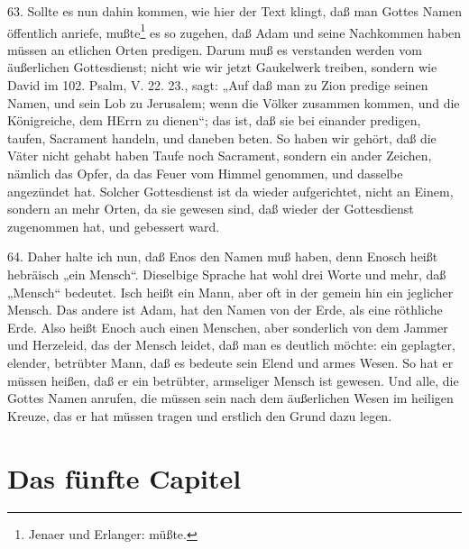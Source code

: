 63. Sollte es nun dahin kommen, wie hier der Text klingt, daß man Gottes Namen öffentlich anriefe, mußte\footnote{Jenaer und Erlanger: müßte.} es so zugehen, daß Adam und seine Nachkommen haben müssen an etlichen Orten predigen. Darum muß es verstanden werden vom äußerlichen Gottesdienst; nicht wie wir jetzt Gaukelwerk treiben, sondern wie David im 102. Psalm, V. 22. 23., sagt: „Auf daß man zu Zion predige seinen Namen, und sein Lob zu Jerusalem; wenn die Völker zusammen kommen, und die Königreiche, dem HErrn zu dienen“; das ist, daß sie bei einander predigen, taufen, Sacrament handeln, und daneben beten. So haben wir gehört, daß die Väter nicht gehabt haben Taufe noch Sacrament, sondern ein ander Zeichen, nämlich das Opfer, da das Feuer vom Himmel genommen, und dasselbe angezündet hat. Solcher Gottesdienst ist da wieder aufgerichtet, nicht an Einem, sondern an mehr Orten, da sie gewesen sind, daß wieder der Gottesdienst zugenommen hat, und gebessert ward.

64. Daher halte ich nun, daß Enos den Namen muß haben, denn Enosch heißt hebräisch „ein Mensch“. Dieselbige Sprache hat wohl drei Worte und mehr, daß „Mensch“ bedeutet. Isch heißt ein Mann, aber oft in der gemein hin ein jeglicher Mensch. Das andere ist Adam,
hat den Namen von der Erde, als eine röthliche Erde. Also heißt Enoch auch einen Menschen, aber sonderlich von dem Jammer und Herzeleid, das der Mensch leidet, daß man es deutlich möchte: ein geplagter, elender, betrübter Mann, daß es bedeute sein Elend und armes Wesen. So hat er müssen heißen, daß er ein betrübter, armseliger Mensch ist gewesen. Und alle, die Gottes Namen anrufen, die müssen sein nach dem äußerlichen Wesen im heiligen Kreuze, das er hat müssen tragen und erstlich den Grund dazu legen.

\section{Das fünfte Capitel}

